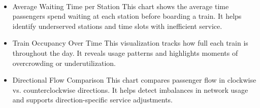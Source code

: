 ~\\[0,5cm]
\begin{itemize}
    \item Average Waiting Time per Station
This chart shows the average time passengers spend waiting at each station before boarding a train. It helps identify underserved stations and time slots with inefficient service.
\end{itemize}
\begin{itemize}
    \item Train Occupancy Over Time
This visualization tracks how full each train is throughout the day. It reveals usage patterns and highlights moments of overcrowding or underutilization.
\end{itemize}

\begin{itemize}
    \item Directional Flow Comparison
This chart compares passenger flow in clockwise vs. counterclockwise directions. It helps detect imbalances in network usage and supports direction-specific service adjustments.
\end{itemize}
